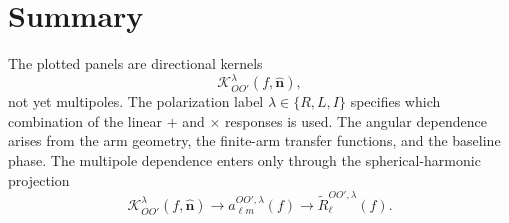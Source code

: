 \documentclass[11pt]{article}
\begin{document}
\section{Summary}

The plotted panels are directional kernels
\[
\mathcal K^\lambda_{OO'}(f,\hat{\bm n}),
\]
not yet multipoles.
The polarization label $\lambda\in\{R,L,I\}$ specifies which combination of the linear $+$ and $\times$ responses is used.
The angular dependence arises from the arm geometry, the finite-arm transfer functions, and the baseline phase.
The multipole dependence enters only through the spherical-harmonic projection
\[
\mathcal K^\lambda_{OO'}(f,\hat{\bm n})
\to
a^{OO',\lambda}_{\ell m}(f)
\to
\widetilde R^{OO',\lambda}_\ell(f).
\]
\end{document}
